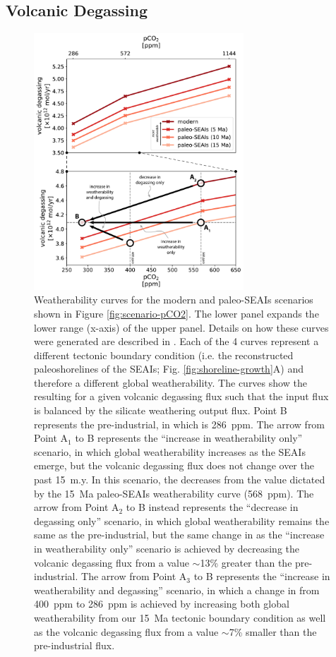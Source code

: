 \subsection{Volcanic Degassing}

\begin{figure}[!htbp]
\begin{center}
	\includegraphics[width=0.7\textwidth]{figures/SEAIs/weatherability-curves.pdf}
	\caption[Weatherability curves.]{Weatherability curves for the modern and paleo-SEAIs scenarios shown in Figure \ref{fig:scenario-pCO2}. The lower panel expands the lower \pCOtwo range (x-axis) of the upper panel. Details on how these curves were generated are described in \MM. Each of the 4 curves represent a different tectonic boundary condition (i.e. the reconstructed paleoshorelines of the SEAIs; Fig. \ref{fig:shoreline-growth}A) and therefore a different global weatherability. The curves show the resulting \pCOtwo for a given volcanic degassing flux such that the input flux is balanced by the silicate weathering output flux. Point B represents the pre-industrial, in which \pCOtwo is 286~ppm. The arrow from Point A$_{1}$ to B represents the ``increase in weatherability only'' scenario, in which global weatherability increases as the SEAIs emerge, but the volcanic degassing flux does not change over the past 15~m.y. In this scenario, the \pCOtwo decreases from the value dictated by the 15~Ma paleo-SEAIs weatherability curve (568~ppm). The arrow from Point A$_{2}$ to B instead represents the ``decrease in degassing only'' scenario, in which global weatherability remains the same as the pre-industrial, but the same change in \pCOtwo as the ``increase in weatherability only'' scenario is achieved by decreasing the volcanic degassing flux from a value $\sim$13\% greater than the pre-industrial. The arrow from Point A$_{3}$ to B represents the ``increase in weatherability and degassing'' scenario, in which a change in \pCOtwo from 400~ppm to 286~ppm is achieved by increasing both global weatherability from our 15~Ma tectonic boundary condition as well as the volcanic degassing flux from a value $\sim$7\% smaller than the pre-industrial flux.}

\end{center}
\end{figure}
